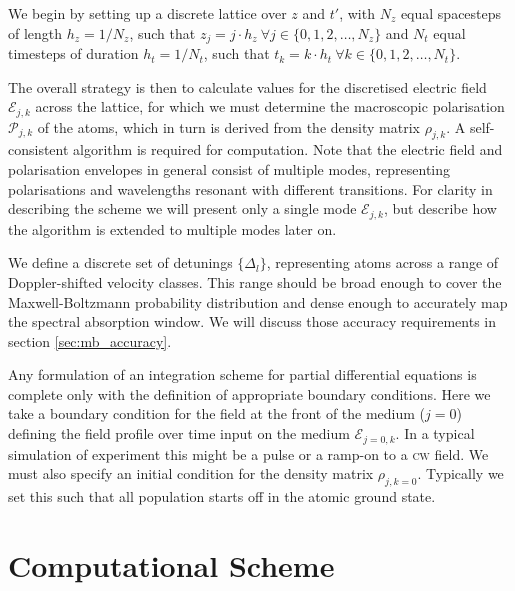     We begin by setting up a discrete lattice over $z$ and $t'$, with $N_z$
    equal spacesteps of length $h_z = 1/N_z$, such that $z_j =  j \cdot h_z ~
    \forall j \in \{0, 1, 2, \dots, N_z\}$ and $N_t$ equal timesteps of duration
    $h_t = 1/N_t$, such that $t_k =  k \cdot h_t ~ \forall k \in \{0, 1, 2,
    \dots, N_t\}$.

    The overall strategy is then to calculate values for the discretised
    electric field $\mathcal{E}_{j,k}$ across the lattice, for which we must
    determine the macroscopic polarisation $\mathcal{P}_{j,k}$ of the atoms,
    which in turn is derived from the density matrix $\rho_{j,k}$.  A self-
    consistent algorithm is required for computation. Note that the electric
    field and polarisation envelopes in general consist of multiple modes,
    representing polarisations and wavelengths resonant with different
    transitions. For clarity in describing the scheme we will present only a
    single mode $\mathcal{E}_{j,k}$, but describe how the algorithm is extended
    to multiple modes later on.

    We define a discrete set of detunings $\{\Delta_l\}$, representing atoms
    across a range of Doppler-shifted velocity classes. This range should be
    broad enough to cover the Maxwell-Boltzmann probability distribution and
    dense enough to accurately map the spectral absorption window. We will
    discuss those accuracy requirements in section \ref{sec:mb_accuracy}.

    Any formulation of an integration scheme for partial differential equations
    is complete only with the definition of appropriate boundary conditions.
    Here we take a boundary condition for the field at the front of the medium
    (\ie $j\!=\!0$) defining the field profile over time input on the medium
    $\mathcal{E}_{j=0, k}$. In a typical simulation of experiment this might be
    a pulse or a ramp-on to a \textsc{cw} field. We must also specify an initial
    condition for the density matrix $\rho_{j, k=0}$. Typically we set this such
    that all population starts off in the atomic ground state.

  \section{Computational Scheme}

